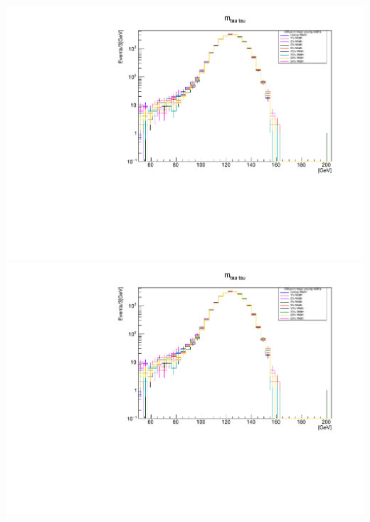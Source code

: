 \documentclass[a4wide,10pt]{article}
\begin{document}
\includegraphics[scale=0.50,page=13]{../Pdfs/Smeared_tt->H_Mass_VaryingWidths.pdf}
\includegraphics[scale=0.50,page=14]{../Pdfs/Smeared_tt->H_Mass_VaryingWidths.pdf}
\end{document}
